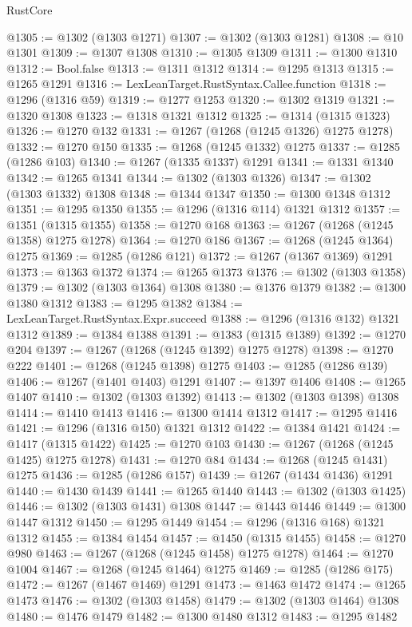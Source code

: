 \begin{lexlean}{RustCore}
\begin{coremodule}
@1305 := @1302 (@1303 @1271)
@1307 := @1302 (@1303 @1281)
@1308 := @10 @1301
@1309 := @1307 @1308
@1310 := @1305 @1309
@1311 := @1300 @1310
@1312 := Bool.false
@1313 := @1311 @1312
@1314 := @1295 @1313
@1315 := @1265 @1291
@1316 := LexLeanTarget.RustSyntax.Callee.function
@1318 := @1296 (@1316 @59)
@1319 := @1277 @1253
@1320 := @1302 @1319
@1321 := @1320 @1308
@1323 := @1318 @1321 @1312
@1325 := @1314 (@1315 @1323)
@1326 := @1270 @132
@1331 := @1267 (@1268 (@1245 @1326) @1275 @1278)
@1332 := @1270 @150
@1335 := @1268 (@1245 @1332) @1275
@1337 := @1285 (@1286 @103)
@1340 := @1267 (@1335 @1337) @1291
@1341 := @1331 @1340
@1342 := @1265 @1341
@1344 := @1302 (@1303 @1326)
@1347 := @1302 (@1303 @1332) @1308
@1348 := @1344 @1347
@1350 := @1300 @1348 @1312
@1351 := @1295 @1350
@1355 := @1296 (@1316 @114) @1321 @1312
@1357 := @1351 (@1315 @1355)
@1358 := @1270 @168
@1363 := @1267 (@1268 (@1245 @1358) @1275 @1278)
@1364 := @1270 @186
@1367 := @1268 (@1245 @1364) @1275
@1369 := @1285 (@1286 @121)
@1372 := @1267 (@1367 @1369) @1291
@1373 := @1363 @1372
@1374 := @1265 @1373
@1376 := @1302 (@1303 @1358)
@1379 := @1302 (@1303 @1364) @1308
@1380 := @1376 @1379
@1382 := @1300 @1380 @1312
@1383 := @1295 @1382
@1384 := LexLeanTarget.RustSyntax.Expr.succeed
@1388 := @1296 (@1316 @132) @1321 @1312
@1389 := @1384 @1388
@1391 := @1383 (@1315 @1389)
@1392 := @1270 @204
@1397 := @1267 (@1268 (@1245 @1392) @1275 @1278)
@1398 := @1270 @222
@1401 := @1268 (@1245 @1398) @1275
@1403 := @1285 (@1286 @139)
@1406 := @1267 (@1401 @1403) @1291
@1407 := @1397 @1406
@1408 := @1265 @1407
@1410 := @1302 (@1303 @1392)
@1413 := @1302 (@1303 @1398) @1308
@1414 := @1410 @1413
@1416 := @1300 @1414 @1312
@1417 := @1295 @1416
@1421 := @1296 (@1316 @150) @1321 @1312
@1422 := @1384 @1421
@1424 := @1417 (@1315 @1422)
@1425 := @1270 @103
@1430 := @1267 (@1268 (@1245 @1425) @1275 @1278)
@1431 := @1270 @84
@1434 := @1268 (@1245 @1431) @1275
@1436 := @1285 (@1286 @157)
@1439 := @1267 (@1434 @1436) @1291
@1440 := @1430 @1439
@1441 := @1265 @1440
@1443 := @1302 (@1303 @1425)
@1446 := @1302 (@1303 @1431) @1308
@1447 := @1443 @1446
@1449 := @1300 @1447 @1312
@1450 := @1295 @1449
@1454 := @1296 (@1316 @168) @1321 @1312
@1455 := @1384 @1454
@1457 := @1450 (@1315 @1455)
@1458 := @1270 @980
@1463 := @1267 (@1268 (@1245 @1458) @1275 @1278)
@1464 := @1270 @1004
@1467 := @1268 (@1245 @1464) @1275
@1469 := @1285 (@1286 @175)
@1472 := @1267 (@1467 @1469) @1291
@1473 := @1463 @1472
@1474 := @1265 @1473
@1476 := @1302 (@1303 @1458)
@1479 := @1302 (@1303 @1464) @1308
@1480 := @1476 @1479
@1482 := @1300 @1480 @1312
@1483 := @1295 @1482

\end{coremodule}
\end{lexlean}
